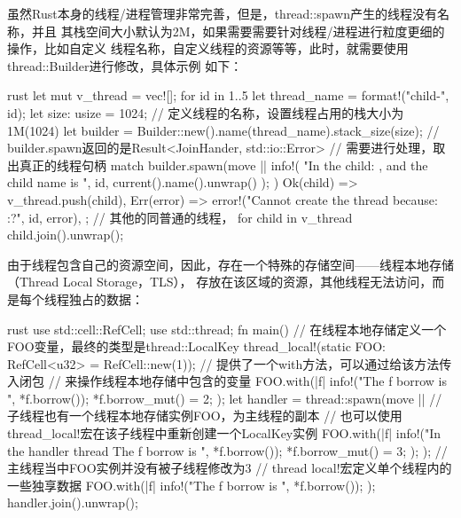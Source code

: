 虽然Rust本身的线程/进程管理非常完善，但是，thread::spawn产生的线程没有名称，并且
其栈空间大小默认为2M，如果需要需要针对线程/进程进行粒度更细的操作，比如自定义
线程名称，自定义线程的资源等等，此时，就需要使用thread::Builder进行修改，具体示例
如下：
\begin{code-block}{rust}
let mut v_thread = vec![];
for id in 1..5 {
    let thread_name = format!("child-{}", id);
    let size: usize = 1024;
    // 定义线程的名称，设置线程占用的栈大小为1M(1024)
    let builder = Builder::new().name(thread_name).stack_size(size);
    // builder.spawn返回的是Result<JoinHander, std::io::Error>
    // 需要进行处理，取出真正的线程句柄
    match builder.spawn(move || {
        info!(
            "In the child: {}, and the child name is {}",
            id,
            current().name().unwrap()
        );
    }) {
        Ok(child) => v_thread.push(child),
        Err(error) => error!("Cannot create the thread {} because: {:?}", id, error),
    };
}
// 其他的同普通的线程，
for child in v_thread {
    child.join().unwrap();
}
\end{code-block}

由于线程包含自己的资源空间，因此，存在一个特殊的存储空间——线程本地存储（Thread Local Storage，TLS），
存放在该区域的资源，其他线程无法访问，而是每个线程独占的数据：
\begin{code-block}{rust}
use std::cell::RefCell;
use std::thread;
fn main() {
    // 在线程本地存储定义一个FOO变量，最终的类型是thread::LocalKey
    thread_local!(static FOO: RefCell<u32> = RefCell::new(1));
    // 提供了一个with方法，可以通过给该方法传入闭包
    // 来操作线程本地存储中包含的变量
    FOO.with(|f| {
        info!("The f borrow is {}", *f.borrow());
        *f.borrow_mut() = 2;
    });
    let handler = thread::spawn(move || {
        // 子线程也有一个线程本地存储实例FOO，为主线程的副本
        // 也可以使用thread_local!宏在该子线程中重新创建一个LocalKey实例
        FOO.with(|f| {
            info!("In the handler thread The f borrow is {}", *f.borrow());
            *f.borrow_mut() = 3;
        });
    });
    // 主线程当中FOO实例并没有被子线程修改为3
    // thread local!宏定义单个线程内的一些独享数据
    FOO.with(|f| {
        info!("The f borrow is {}", *f.borrow());
    });
    handler.join().unwrap();
}
\end{code-block}

